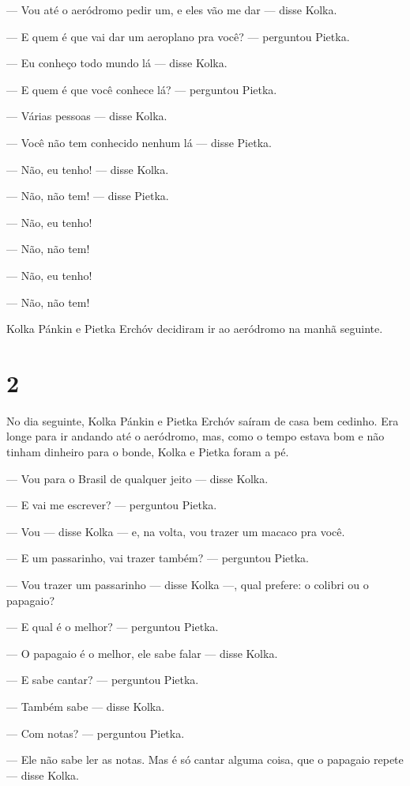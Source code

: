 --- Vou até o aeródromo pedir um, e eles vão me dar --- disse Kolka.

--- E quem é que vai dar um aeroplano pra você? --- perguntou Pietka.

--- Eu conheço todo mundo lá --- disse Kolka.

--- E quem é que você conhece lá? --- perguntou Pietka.

--- Várias pessoas --- disse Kolka.

--- Você não tem conhecido nenhum lá --- disse Pietka.

--- Não, eu tenho! --- disse Kolka.

--- Não, não tem! --- disse Pietka.

--- Não, eu tenho!

--- Não, não tem!

--- Não, eu tenho!

--- Não, não tem!

Kolka Pánkin e Pietka Erchóv decidiram ir ao aeródromo na manhã
seguinte.

\section{2}

No dia seguinte, Kolka Pánkin e Pietka Erchóv saíram de casa bem
cedinho. Era longe para ir andando até o aeródromo, mas, como o tempo
estava bom e não tinham dinheiro para o bonde, Kolka e Pietka foram a
pé.

--- Vou para o Brasil de qualquer jeito --- disse Kolka.

--- E vai me escrever? --- perguntou Pietka.

--- Vou --- disse Kolka --- e, na volta, vou trazer um macaco pra você.

--- E um passarinho, vai trazer também? --- perguntou Pietka.

--- Vou trazer um passarinho --- disse Kolka ---, qual prefere: o
colibri ou o papagaio?

--- E qual é o melhor? --- perguntou Pietka.

--- O papagaio é o melhor, ele sabe falar --- disse Kolka.

--- E sabe cantar? --- perguntou Pietka.

--- Também sabe --- disse Kolka.

--- Com notas? --- perguntou Pietka.

--- Ele não sabe ler as notas. Mas é só cantar alguma coisa, que o
papagaio repete --- disse Kolka.


